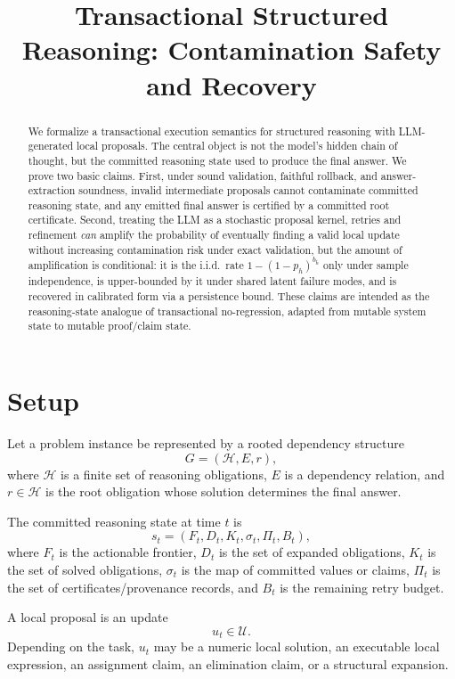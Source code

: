 \documentclass[11pt]{article}
\title{Transactional Structured Reasoning: Contamination Safety and Recovery}
\author{}
\date{}
\newcommand{\Actions}{\mathcal{U}}
\newcommand{\Obligations}{\mathcal{H}}
\begin{document}
\maketitle

\begin{abstract}
We formalize a transactional execution semantics for structured reasoning with
LLM-generated local proposals. The central object is not the model's hidden chain
of thought, but the committed reasoning state used to produce the final answer.
We prove two basic claims. First, under sound validation, faithful rollback,
and answer-extraction soundness, invalid intermediate proposals cannot
contaminate committed reasoning state, and any emitted final answer is
certified by a committed root certificate. Second, treating the LLM as a
stochastic proposal kernel, retries and refinement \emph{can} amplify the
probability of eventually finding a valid local update without increasing
contamination risk under exact validation, but the amount of amplification
is conditional: it is the i.i.d.\ rate $1-(1-p_h)^{b_h}$ only under sample
independence, is upper-bounded by it under shared latent failure modes, and
is recovered in calibrated form via a persistence bound. These claims are
intended as the reasoning-state analogue of transactional no-regression,
adapted from mutable system state to mutable proof/claim state.
\end{abstract}

\section{Setup}

Let a problem instance be represented by a rooted dependency structure
\[
G = (\Obligations, E, r),
\]
where $\Obligations$ is a finite set of reasoning obligations, $E$ is a
dependency relation, and $r \in \Obligations$ is the root obligation whose
solution determines the final answer.

The committed reasoning state at time $t$ is
\[
s_t = (F_t, D_t, K_t, \sigma_t, \Pi_t, B_t),
\]
where $F_t$ is the actionable frontier, $D_t$ is the set of expanded obligations,
$K_t$ is the set of solved obligations, $\sigma_t$ is the map of committed
values or claims, $\Pi_t$ is the set of certificates/provenance records, and
$B_t$ is the remaining retry budget.

A local proposal is an update
\[
u_t \in \Actions.
\]
Depending on the task, $u_t$ may be a numeric local solution, an executable local
expression, an assignment claim, an elimination claim, or a structural expansion.
\end{document}

